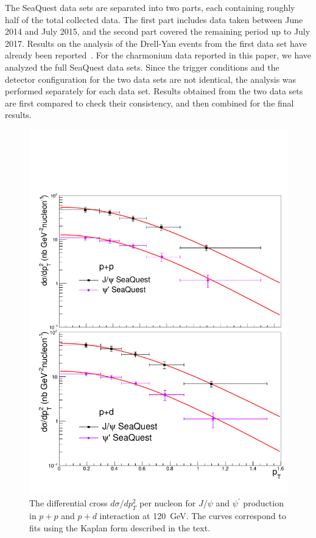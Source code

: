 \documentclass[reprint,aps,unsortedaddress,superscriptaddress,prl,floatfix,showpacs,linenumbers]{revtex4-2}
\begin{document}
The SeaQuest data sets are separated into two parts, each containing
roughly half of the total collected data. The first part includes data
taken between June 2014 and July 2015, and the second part covered the
remaining period up to July 2017.
Results on the analysis of the Drell-Yan events from the first data set
have already been reported~\cite{dove2021,dove2023}. For the charmonium data
reported in this paper, we have analyzed the full SeaQuest data sets.
Since the trigger conditions and the detector configuration for the two
data sets are not identical, the analysis was performed
separately for each data set. Results obtained from the two data sets
are first compared to check their consistency, and then combined for
the final results.

\begin{figure}[tb]
	\includegraphics*[width=\linewidth]{crossSections/pT/cs_pT_full}
	\caption{The differential cross
		$d\sigma / d p^2_T$ per nucleon for $J/\psi$ and $\psi^\prime$
		production in $p+p$ and $p+d$ interaction at \SI{120}{\GeV}.
		The curves correspond to fits using the Kaplan form described in the
		text.}
	\label{fig:cs_pT}
\end{figure}
\end{document}
